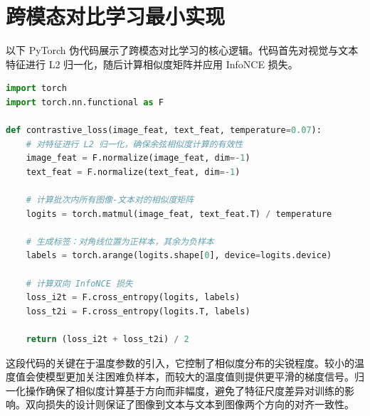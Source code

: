 \section{跨模态对比学习最小实现}
以下 PyTorch 伪代码展示了跨模态对比学习的核心逻辑。代码首先对视觉与文本特征进行 L2 归一化，随后计算相似度矩阵并应用 InfoNCE 损失。\par
\begin{lstlisting}[language=python]
import torch
import torch.nn.functional as F

def contrastive_loss(image_feat, text_feat, temperature=0.07):
    # 对特征进行 L2 归一化，确保余弦相似度计算的有效性
    image_feat = F.normalize(image_feat, dim=-1)
    text_feat = F.normalize(text_feat, dim=-1)
    
    # 计算批次内所有图像-文本对的相似度矩阵
    logits = torch.matmul(image_feat, text_feat.T) / temperature
    
    # 生成标签：对角线位置为正样本，其余为负样本
    labels = torch.arange(logits.shape[0], device=logits.device)
    
    # 计算双向 InfoNCE 损失
    loss_i2t = F.cross_entropy(logits, labels)
    loss_t2i = F.cross_entropy(logits.T, labels)
    
    return (loss_i2t + loss_t2i) / 2
\end{lstlisting}
这段代码的关键在于温度参数的引入，它控制了相似度分布的尖锐程度。较小的温度值会使模型更加关注困难负样本，而较大的温度值则提供更平滑的梯度信号。归一化操作确保了相似度计算基于方向而非幅度，避免了特征尺度差异对训练的影响。双向损失的设计则保证了图像到文本与文本到图像两个方向的对齐一致性。\par
